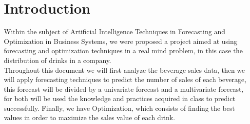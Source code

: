 \newpage

\section{Introduction}

\quad Within the subject of Artificial Intelligence Techniques in Forecasting and Optimization in Business Systems, we were proposed a project aimed at using forecasting and optimization techniques in a real mind problem, in this case the distribution of drinks in a company. \\


Throughout this document we will first analyze the beverage sales data, then we will apply forecasting techniques to predict the number of sales of each beverage, this forecast will be divided by a univariate forecast and a multivariate forecast, for both will be used the knowledge and practices acquired in class to predict successfully. Finally, we have Optimization, which consists of finding the best values in order to maximize the sales value of each drink.
